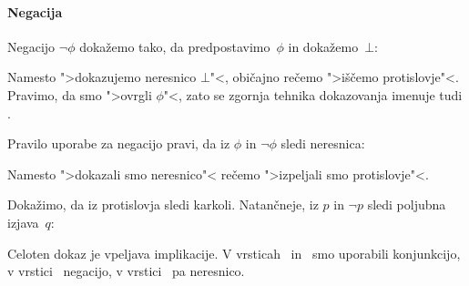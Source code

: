 \paragraph*{Negacija}
\label{sec:negacija-pravila}

Negacijo $\lnot \phi$ dokažemo tako, da predpostavimo~$\phi$ in dokažemo~$\bot$:
%
\begin{boxDisplay}
  \begin{boxedProof}
    \begin{boxFrame}
    \end{boxFrame}
  \end{boxedProof}
\end{boxDisplay}
%
Namesto ">dokazujemo neresnico $\bot$"<, običajno rečemo ">iščemo protislovje"<.
%
Pravimo, da smo ">ovrgli $\phi$"<, zato se zgornja tehnika dokazovanja imenuje tudi .

Pravilo uporabe za negacijo pravi, da iz $\phi$ in $\neg \phi$ sledi neresnica:
%
\begin{boxDisplay}
  \begin{boxedProof}[reserved]
    \begin{boxFrame}
      \boxGap
      \boxGap
    \end{boxFrame}
  \end{boxedProof}
\end{boxDisplay}
%
Namesto ">dokazali smo neresnico"< rečemo ">izpeljali smo protislovje"<.

\begin{zgled}
  Dokažimo, da iz protislovja sledi karkoli. Natančneje, iz $p$ in $\neg p$ sledi poljubna izjava~$q$:
  \begin{boxDisplay}
  \begin{boxedProof}[numbered]
    \begin{boxFrame}
    \end{boxFrame}
  \end{boxedProof}
  \end{boxDisplay}
  Celoten dokaz je vpeljava implikacije.
  V vrsticah~ in~ smo uporabili konjunkcijo,
  v vrstici~ negacijo, v vrstici~ pa neresnico.
\end{zgled}


